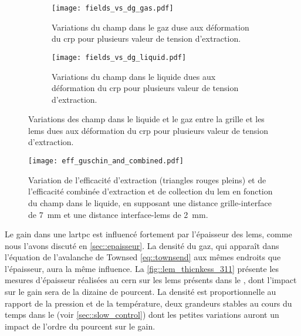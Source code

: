       \begin{figure}[htbp]
        \centering
        \begin{subfigure}[t]{0.48\textwidth}
          \centering
          \texttt{[image: fields\_vs\_dg\_gas.pdf]}
          \caption[]{Variations du champ dans le gaz duse aux déformation du \gls{crp} pour plusieurs valeur de tension d'extraction.}
        \end{subfigure}\hfill
        \begin{subfigure}[t]{0.48\textwidth}
          \centering
          \texttt{[image: fields\_vs\_dg\_liquid.pdf]}
          \caption[]{Variations du champ dans le liquide dues aux déformation du \gls{crp} pour plusieurs valeur de tension d'extraction.}
        \end{subfigure}
        \caption[Variation des champs d'extraction dues à la déformation du \gls{crp}.]{\label{fig::fields_vs_dg}Variations des champ dans le liquide et le gaz entre la grille et les \glspl{lem} dues aux déformation du \gls{crp} pour plusieurs valeur de tension d'extraction.}
      \end{figure}

      \begin{figure}[htbp]
        \centering
        \texttt{[image: eff\_guschin\_and\_combined.pdf]}
        \caption[Efficacité combinée d'extraction et de collection en fonction du champ dans le liquide.]{\label{fig::eff_guschin_and_combined}Variation de l'efficacité d'extraction (triangles rouges pleins) et de l'efficacité combinée d'extraction et de collection du \gls{lem} en fonction du champ dans le liquide, en supposant une distance grille-interface de \SI{7}{\milli\meter} et une distance interface-\glspl{lem} de \SI{2}{\milli\meter}.}
      \end{figure}

      Le gain dans une \gls{lartpc} est influencé fortement par l'épaisseur des \glspl{lem}, comme nous l'avons discuté en \autoref{sec::epaisseur}. La densité du gaz, qui apparaît dans l'équation de l'avalanche de Townsed \eqref{eq::townsend} aux mêmes endroits que l'épaisseur, aura la même influence. La \autoref{fig::lem_thicnkess_311} présente les mesures d'épaisseur réalisées au \gls{cern} sur les \glspl{lem} présents dans le \TOO{}, dont l'impact sur le gain sera de la dizaine de pourcent. La densité est proportionnelle au rapport de la pression et de la température, deux grandeurs stables au cours du temps dans le \TOO{} (voir \autoref{sec::slow_control}) dont les petites variations auront un impact de l'ordre du pourcent sur le gain. 

